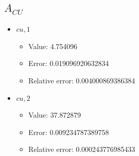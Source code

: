 \documentclass{article}%
\begin{document}
\subsection{$A_{CU}$}%
\begin{itemize}%
	\item $\textit{cu},1$%
	\begin{itemize}%
		\item Value: 4.754096%
		\item Error: 0.019096920632834%
		\item Relative error: 0.004000869386384%
	\end{itemize}%
	\item $\textit{cu},2$%
	\begin{itemize}%
		\item Value: 37.872879%
		\item Error: 0.009234787389758%
		\item Relative error: 0.000243776985433%
	\end{itemize}%
\end{itemize}%
\end{document}
